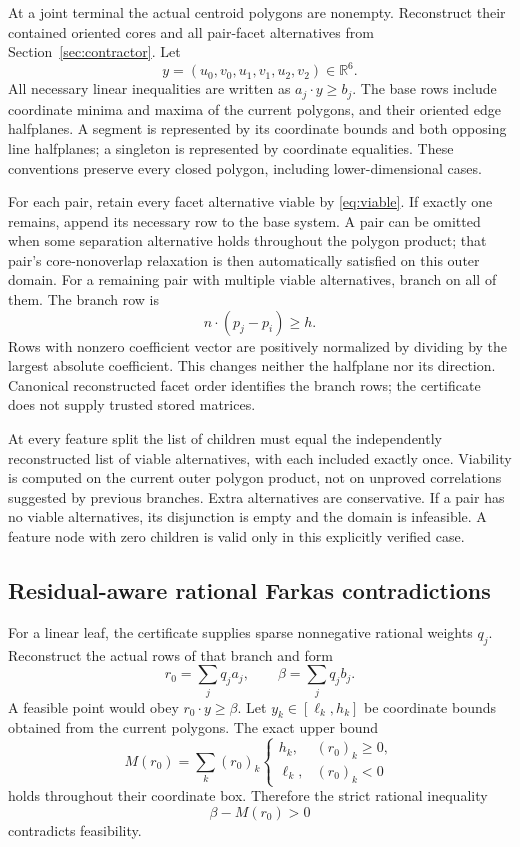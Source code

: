 \documentclass[11pt]{article}
\begin{document}
At a joint terminal the actual centroid polygons are nonempty. Reconstruct their contained oriented cores and all pair-facet alternatives from Section~\ref{sec:contractor}. Let
\[
 y=(u_0,v_0,u_1,v_1,u_2,v_2)\in\mathbb R^6.
\]
All necessary linear inequalities are written as $a_j\cdot y\ge b_j$. The base rows include coordinate minima and maxima of the current polygons, and their oriented edge halfplanes. A segment is represented by its coordinate bounds and both opposing line halfplanes; a singleton is represented by coordinate equalities. These conventions preserve every closed polygon, including lower-dimensional cases.

For each pair, retain every facet alternative viable by \eqref{eq:viable}. If exactly one remains, append its necessary row to the base system. A pair can be omitted when some separation alternative holds throughout the polygon product; that pair's core-nonoverlap relaxation is then automatically satisfied on this outer domain. For a remaining pair with multiple viable alternatives, branch on all of them. The branch row is
\[
 n\cdot(p_j-p_i)\ge h.
\]
Rows with nonzero coefficient vector are positively normalized by dividing by the largest absolute coefficient. This changes neither the halfplane nor its direction. Canonical reconstructed facet order identifies the branch rows; the certificate does not supply trusted stored matrices.

At every feature split the list of children must equal the independently reconstructed list of viable alternatives, with each included exactly once. Viability is computed on the current outer polygon product, not on unproved correlations suggested by previous branches. Extra alternatives are conservative. If a pair has no viable alternatives, its disjunction is empty and the domain is infeasible. A feature node with zero children is valid only in this explicitly verified case.

\subsection{Residual-aware rational Farkas contradictions}\label{subsec:farkas}

For a linear leaf, the certificate supplies sparse nonnegative rational weights $q_j$. Reconstruct the actual rows of that branch and form
\[
 r_0=\sum_jq_ja_j,\qquad \beta=\sum_jq_jb_j.
\]
A feasible point would obey $r_0\cdot y\ge\beta$. Let $y_k\in[\ell_k,h_k]$ be coordinate bounds obtained from the current polygons. The exact upper bound
\[
 M(r_0)=\sum_k(r_0)_k
 \begin{cases}
 h_k,&(r_0)_k\ge0,\\
 \ell_k,&(r_0)_k<0
 \end{cases}
\]
holds throughout their coordinate box. Therefore the strict rational inequality
\begin{equation}\label{eq:residual-farkas}
 \beta-M(r_0)>0
\end{equation}
contradicts feasibility.
\end{document}
